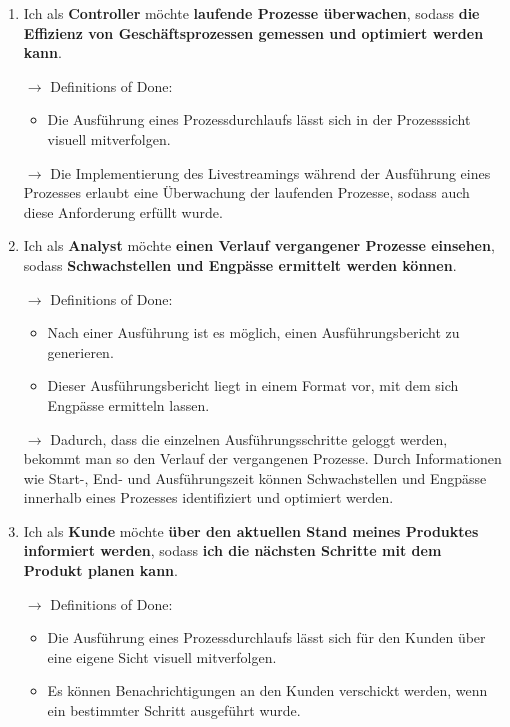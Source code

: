 \begin{enumerate}
    \item Ich als \textbf{Controller} möchte \textbf{laufende Prozesse überwachen}, sodass \textbf{die Effizienz von Geschäftsprozessen 
    gemessen und optimiert werden kann}.

    $\to$ Definitions of Done:

    \begin{itemize}
        \item Die Ausführung eines Prozessdurchlaufs lässt sich in der Prozesssicht visuell mitverfolgen.
    \end{itemize}

    $\to$ Die Implementierung des Livestreamings während der Ausführung eines Prozesses erlaubt eine Überwachung der laufenden Prozesse, sodass 
    auch diese Anforderung erfüllt wurde.

    \item Ich als \textbf{Analyst} möchte \textbf{einen Verlauf vergangener Prozesse einsehen}, sodass \textbf{Schwachstellen und Engpässe
    ermittelt werden können}.

    $\to$ Definitions of Done:

    \begin{itemize}
        \item Nach einer Ausführung ist es möglich, einen Ausführungsbericht zu generieren.
        \item Dieser Ausführungsbericht liegt in einem Format vor, mit dem sich Engpässe ermitteln lassen.
    \end{itemize}

    $\to$ Dadurch, dass die einzelnen Ausführungsschritte geloggt werden, bekommt man so den Verlauf der vergangenen Prozesse. Durch Informationen wie 
    Start-, End- und Ausführungszeit können Schwachstellen und Engpässe innerhalb eines Prozesses identifiziert und optimiert werden.

    \item Ich als \textbf{Kunde} möchte \textbf{über den aktuellen Stand meines Produktes informiert werden}, sodass \textbf{ich die nächsten
    Schritte mit dem Produkt planen kann}.

    $\to$ Definitions of Done:

    \begin{itemize}
        \item Die Ausführung eines Prozessdurchlaufs lässt sich für den Kunden über eine eigene Sicht visuell mitverfolgen.
        \item Es können Benachrichtigungen an den Kunden verschickt werden, wenn ein bestimmter Schritt ausgeführt wurde.
    \end{itemize}


\end{enumerate}
